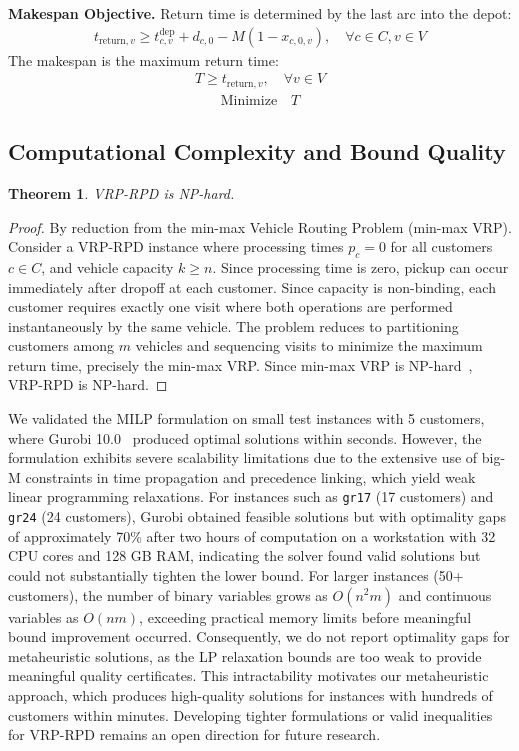 \documentclass{article}
\newtheorem{theorem}{Theorem}
\begin{document}
\textbf{Makespan Objective.}
Return time is determined by the last arc into the depot:
\begin{align}
t_{\text{return},v} \ge t^{\text{dep}}_{c,v} + d_{c,0} - M(1-x_{c,0,v}),
\quad \forall c\in C, v\in V
\end{align}
The makespan is the maximum return time:
\begin{align}
T \ge t_{\text{return},v},\quad \forall v\in V
\end{align}
\begin{align}
\text{Minimize}\quad T
\end{align}


\subsection{Computational Complexity and Bound Quality}

\begin{theorem}
VRP-RPD is NP-hard.
\end{theorem}

\begin{proof}
By reduction from the min-max Vehicle Routing Problem (min-max VRP). 
Consider a VRP-RPD instance where processing times $p_c = 0$ for all 
customers $c \in C$, and vehicle capacity $k \geq n$. Since processing 
time is zero, pickup can occur immediately after dropoff at each customer. 
Since capacity is non-binding, each customer requires exactly one visit 
where both operations are performed instantaneously by the same vehicle. 
The problem reduces to partitioning customers among $m$ vehicles and 
sequencing visits to minimize the maximum return time, precisely the 
min-max VRP. Since min-max VRP is NP-hard~\cite{lenstra1981complexity}, 
VRP-RPD is NP-hard.
\end{proof}

We validated the MILP formulation on small test instances with 5 customers,
where Gurobi 10.0~\cite{gurobi} produced optimal solutions within seconds.
However, the formulation exhibits severe scalability limitations due to the
extensive use of big-M constraints in time propagation and precedence linking,
which yield weak linear programming relaxations. For instances such as
\texttt{gr17} (17 customers) and \texttt{gr24} (24 customers), Gurobi obtained
feasible solutions but with optimality gaps of approximately 70\% after two hours
of computation on a workstation with 32 CPU cores and 128 GB RAM, indicating the
solver found valid solutions but could not substantially tighten the lower
bound. For larger instances (50+ customers), the number of binary variables
grows as $O(n^2 m)$ and continuous variables as $O(nm)$, exceeding practical
memory limits before meaningful bound improvement occurred. Consequently, we do
not report optimality gaps for metaheuristic solutions, as the LP relaxation
bounds are too weak to provide meaningful quality certificates. This
intractability motivates our metaheuristic approach, which produces high-quality
solutions for instances with hundreds of customers within minutes. Developing
tighter formulations or valid inequalities for VRP-RPD remains an open direction
for future research.
\end{document}
